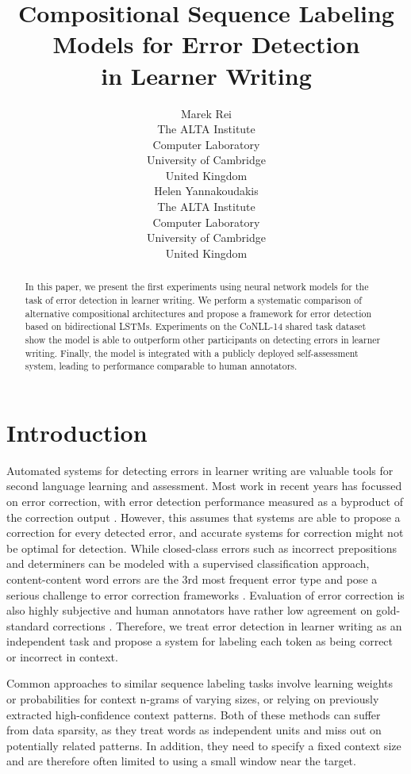 \documentclass[11pt]{article}
\title{Compositional Sequence Labeling Models for Error Detection \\ in Learner Writing}
\author{\hspace{-0.5cm}Marek Rei\\
	    \hspace{-0.5cm}The ALTA Institute\\
	    \hspace{-0.5cm}Computer Laboratory\\
	    \hspace{-0.5cm}University of Cambridge\\
        \hspace{-0.5cm}United Kingdom\\
	    \hspace{-0.5cm}{\tt marek.rei@cl.cam.ac.uk}
	    \And
	    \hspace{0.5cm}Helen Yannakoudakis\\
	    \hspace{0.5cm}The ALTA Institute\\
	    \hspace{0.5cm}Computer Laboratory\\
	    \hspace{0.5cm}University of Cambridge\\
        \hspace{0.5cm}United Kingdom\\
        \hspace{0.5cm}{\tt helen.yannakoudakis@cl.cam.ac.uk}}
\date{}
\begin{document}
\maketitle
\begin{abstract}
In this paper, we present the first experiments using neural network models for the task of error detection in learner writing.
We perform a systematic comparison of alternative compositional architectures and propose a framework for error detection based on bidirectional LSTMs.
Experiments on the CoNLL-14 shared task dataset show the model is able to outperform other participants on detecting errors in learner writing.
Finally, the model is integrated with a publicly deployed self-assessment system, leading to performance comparable to human annotators.


\end{abstract}


\section{Introduction}





Automated systems for detecting errors in learner writing are valuable tools for second language learning and assessment.
Most work in recent years has focussed on error correction, with error detection performance measured as a byproduct of the correction output \cite{Ng2013,Ng2013a}. 
However, this assumes that systems are able to propose a correction for every detected error, and accurate systems for correction might not be optimal for detection.
While  closed-class errors such as incorrect prepositions and determiners can be modeled with a supervised classification approach, content-content word errors are the 3rd most frequent error type and pose a serious challenge to error correction frameworks \cite{Leacock2014,Kochmar2014}.
Evaluation of error correction is also highly subjective and human annotators have rather low agreement on gold-standard corrections \cite{Bryant2015}.
Therefore, we treat error detection in learner writing as an independent task and propose a system for labeling each token as being correct or incorrect in context.








Common approaches to similar sequence labeling tasks involve learning weights or probabilities for context n-grams of varying sizes, or relying on previously extracted high-confidence context patterns. Both of these methods can suffer from data sparsity, as they treat words as independent units and miss out on potentially related patterns. In addition, they need to specify a fixed context size and are therefore often limited to using a small window near the target.
\end{document}
